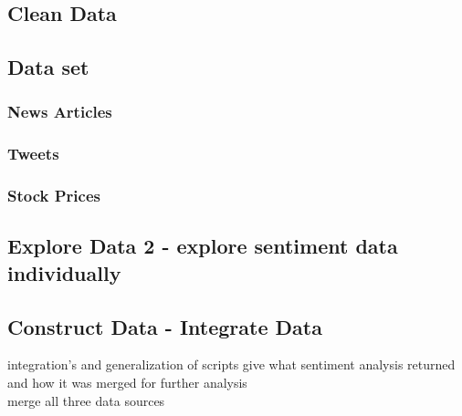 \documentclass[sigconf, nonacm]{acmart}
\begin{document}
\subsection{Clean Data} 



\subsection{Data set} %
\subsubsection{News Articles}

\subsubsection{Tweets}

\subsubsection{Stock Prices}

\subsection{Explore Data 2 - explore sentiment data individually} %

\subsection{Construct Data - Integrate Data } 
integration's and generalization of scripts
give what sentiment analysis returned and how it was merged for further analysis
\\merge all three data sources



\end{document}
